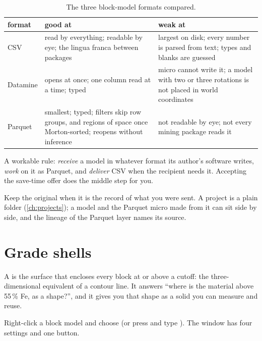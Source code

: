 \begin{table}[htbp]
\small
\begin{tabularx}{\linewidth}{@{}lLL@{}}\toprule
format & good at & weak at \\ \midrule
CSV & read by everything; readable by eye; the lingua franca between packages & largest on disk; every number is parsed from text; types and blanks are guessed \\
Datamine  & opens at once; one column read at a time; typed & micro cannot write it; a model with two or three rotations is not placed in world coordinates \\
Parquet & smallest; typed; filters skip row groups, and regions of space once Morton-sorted; reopens without inference & not readable by eye; not every mining package reads it \\
\bottomrule
\end{tabularx}
\caption{The three block-model formats compared.}\label{tab:blocks-formats}
\end{table}

A workable rule: \emph{receive} a model in whatever format its author's software writes, \emph{work} on it as Parquet, and \emph{deliver} CSV when the recipient needs it. Accepting the save-time offer does the middle step for you.

Keep the original when it is the record of what you were sent. A project is a plain folder (\cref{ch:projects}); a model and the Parquet micro made from it can sit side by side, and the lineage of the Parquet layer names its source.

\section{Grade shells}\label{sec:blocks-shells}

A  is the surface that encloses every block at or above a cutoff: the three-dimensional equivalent of a contour line. It answers ``where is the material above 55\,\% Fe, as a shape?'', and it gives you that shape as a solid you can measure and reuse.

Right-click a block model and choose  (or press  and type ). The window has four settings and one button.

